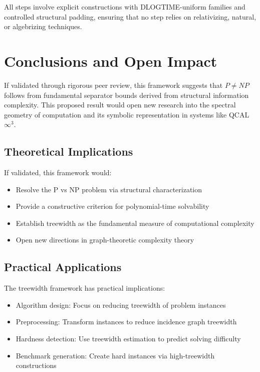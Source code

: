 \documentclass[11pt]{article}
\begin{document}
All steps involve explicit constructions with DLOGTIME-uniform families and controlled structural padding, ensuring that no step relies on relativizing, natural, or algebrizing techniques.

\section{Conclusions and Open Impact}

If validated through rigorous peer review, this framework suggests that $P \neq NP$ follows from fundamental separator bounds derived from structural information complexity. This proposed result would open new research into the spectral geometry of computation and its symbolic representation in systems like QCAL $\infty^3$.

\subsection{Theoretical Implications}

If validated, this framework would:
\begin{itemize}
\item Resolve the P vs NP problem via structural characterization
\item Provide a constructive criterion for polynomial-time solvability
\item Establish treewidth as the fundamental measure of computational complexity
\item Open new directions in graph-theoretic complexity theory
\end{itemize}

\subsection{Practical Applications}

The treewidth framework has practical implications:
\begin{itemize}
\item Algorithm design: Focus on reducing treewidth of problem instances
\item Preprocessing: Transform instances to reduce incidence graph treewidth
\item Hardness detection: Use treewidth estimation to predict solving difficulty
\item Benchmark generation: Create hard instances via high-treewidth constructions
\end{itemize}
\end{document}
